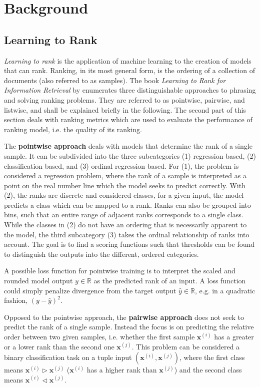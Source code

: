 \section{Background}
\label{sec:background}

\subsection{Learning to Rank}
\label{sec:learningtorank}

\textit{Learning to rank} is the application of machine learning to the creation of models that can rank. Ranking, in its most general form, is the ordering of a collection of documents (also referred to as samples). The book \textit{Learning to Rank for Information Retrieval} by \cite{liu2009learningtorank} enumerates three distinguishable approaches to phrasing and solving ranking problems. They are referred to as pointwise, pairwise, and listwise, and shall be explained briefly in the following. The second part of this section deals with ranking metrics which are used to evaluate the performance of ranking model, i.e. the quality of its ranking.

The \textbf{pointwise approach} deals with models that determine the rank of a single sample. It can be subdivided into the three subcategories (1) regression based, (2) classification based, and (3) ordinal regression based. For (1), the problem is considered a regression problem, where the rank of a sample is interpreted as a point on the real number line which the model seeks to predict correctly. With (2), the ranks are discrete and considered classes, for a given input, the model predicts a class which can be mapped to a rank. Ranks can also be grouped into bins, such that an entire range of adjacent ranks corresponds to a single class. While the classes in (2) do not have an ordering that is necessarily apparent to the model, the third subcategory (3) takes the ordinal relationship of ranks into account. The goal is to find a scoring functions such that thresholds can be found to distinguish the outputs into the different, ordered categories.

A possible loss function for pointwise training is to interpret the scaled and rounded model output $y\in\mathbb{R}$ as the predicted rank of an input. A loss function could simply penalize divergence from the target output $\hat{y}\in\mathbb{R}$, e.g. in a quadratic fashion, $(y-\hat{y})^2$.

Opposed to the pointwise approach, the \textbf{pairwise approach} does not seek to predict the rank of a single sample. Instead the focus is on predicting the relative order between two given samples, i.e. whether the first sample $\bm{x}^{(i)}$ has a greater or a lower rank than the second one $\bm{x}^{(j)}$. This problem can be considered a binary classification task on a tuple input $(\bm{x}^{(i)},\bm{x}^{(j)})$, where the first class means $\bm{x}^{(i)}\triangleright \bm{x}^{(j)}$ ($\bm{x}^{(i)}$ has a higher rank than $\bm{x}^{(j)}$) and the second class means $\bm{x}^{(i)}\triangleleft \bm{x}^{(j)}$.

